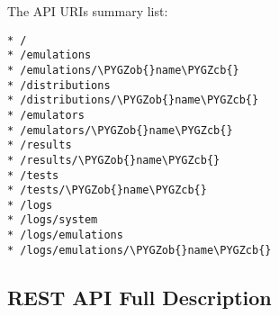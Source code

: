 \documentclass[letterpaper,10pt,english]{sphinxmanual}
\def\PYGZob{\char`\{}
\def\PYGZcb{\char`\}}
\begin{document}
The API URIs summary list:

\begin{Verbatim}[commandchars=\\\{\}]
* /
* /emulations
* /emulations/\PYGZob{}name\PYGZcb{}
* /distributions
* /distributions/\PYGZob{}name\PYGZcb{}
* /emulators
* /emulators/\PYGZob{}name\PYGZcb{}
* /results
* /results/\PYGZob{}name\PYGZcb{}
* /tests
* /tests/\PYGZob{}name\PYGZcb{}
* /logs
* /logs/system
* /logs/emulations
* /logs/emulations/\PYGZob{}name\PYGZcb{}
\end{Verbatim}


\subsection{REST API Full Description}
\label{01_how_to_use_it:rest-api-full-description}
\end{document}
